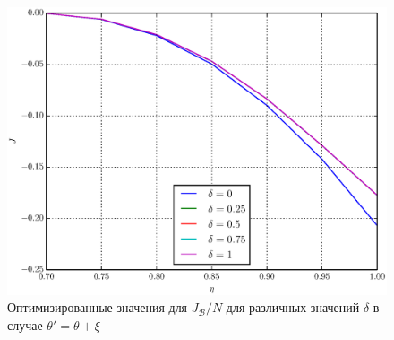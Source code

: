 \documentclass[%
master,         %
subf,           %
href,           %
,times         %
]{disser}
\numberwithin{equation}{section}
\numberwithin{figure}{section}
\begin{document}
\begin{figure}[t]
\includegraphics[scale=0.7]{J_ang.eps}
\caption{Оптимизированные значения для $J_{\mathcal{B}}/N$ для различных значений $\delta$ в случае $\theta' = \theta + \xi$}
\label{fig:J_ang}
\end{figure}


\begingroup
\small
\end{document}
